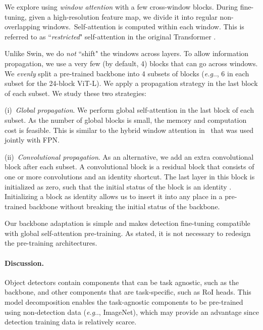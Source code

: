 \documentclass[runningheads]{llncs}
\makeatletter
\DeclareRobustCommand\onedot{\futurelet\@let@token\@onedot}
\def\@onedot{\ifx\@let@token.\else.\null\fi\xspace}
\def\eg{\emph{e.g}\onedot} \def\Eg{\emph{E.g}\onedot}
\makeatother
\begin{document}
We explore using \textit{window attention} \cite{Vaswani2017} with a few cross-window blocks. During fine-tuning, given a high-resolution feature map, we divide it into regular non-overlapping windows.\footnotemark~Self-attention is computed within each window. This is referred to as ``\textit{restricted}" self-attention in the original Transformer \cite{Vaswani2017}. 


Unlike Swin, we do \textit{not} ``shift" \cite{Liu2021} the windows across layers. To allow information propagation, we use a very few (by default, 4) blocks that can go across windows.
We \textit{evenly} split a pre-trained backbone into 4 subsets of blocks (\eg, 6 in each subset for the 24-block ViT-L). We apply a propagation strategy in the last block of each subset.
We study these two strategies:

\vspace{.5em}
(i)~\emph{Global propagation}. We perform global self-attention in the last block of each subset. As the number of global blocks is small, the memory and computation cost is feasible. This is similar to the hybrid window attention in~\cite{Li2021a} that was used jointly with FPN.

(ii)~\emph{Convolutional propagation}. As an alternative, we add an extra convolutional block after each subset.
A convolutional block is a residual block \cite{He2016} that consists of one or more convolutions and an identity shortcut. The last layer in this block is initialized as zero, such that the initial status of the block is an identity \cite{Goyal2017}. Initializing a block as identity allows us to insert it into any place in a pre-trained backbone without breaking the initial status of the backbone.

\vspace{.5em}
Our backbone adaptation is simple and makes detection fine-tuning compatible with global self-attention pre-training. As stated, it is not necessary to redesign the pre-training architectures.

\paragraph{Discussion.} Object detectors contain components that can be task agnostic, such as the backbone, and other components that are task-specific, such as RoI heads. This model decomposition enables the task-agnostic components to be pre-trained using non-detection data (\eg, ImageNet), which may provide an advantage since detection training data is relatively scarce.
\end{document}
